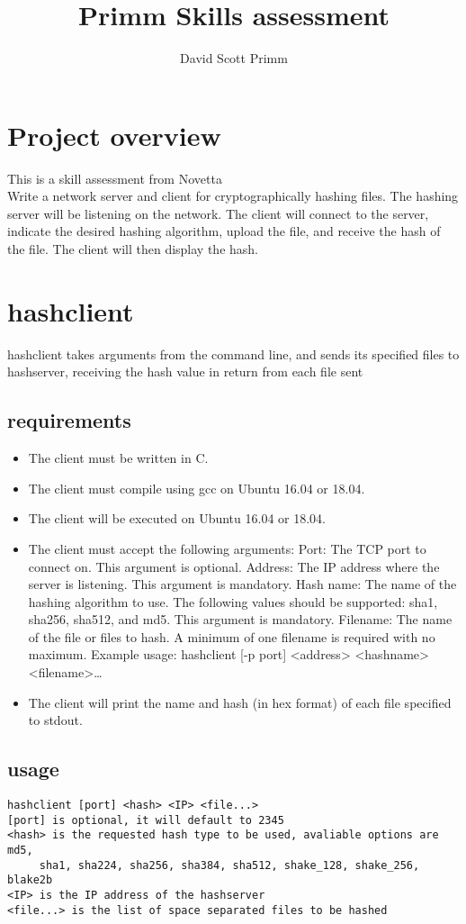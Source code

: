 \documentclass[12pt]{article}
\begin{document}
\title{Primm Skills assessment}
\author{David Scott Primm}
\maketitle
\pagebreak

\tableofcontents
\pagebreak 
\section{Project overview}
This is a skill assessment from Novetta\\
Write a network server and client for cryptographically hashing files. The hashing server will be listening on the network. The client will connect to the server, indicate the desired hashing algorithm, upload the file, and receive the hash of the file. The client will then display the hash.
\section{hashclient}
hashclient takes arguments from the command line, and sends its specified files to hashserver, receiving the hash value in return from each file sent
\subsection{requirements}
\begin{itemize}
	\item The client must be written in C.
	\item The client must compile using gcc on Ubuntu 16.04 or 18.04.
	\item The client will be executed on Ubuntu 16.04 or 18.04.
	\item The client must accept the following arguments:
	\subitem Port: The TCP port to connect on. This argument is optional.
	\subitem Address: The IP address where the server is listening. This argument is mandatory.
	\subitem Hash name: The name of the hashing algorithm to use. The following values should be supported: sha1, sha256, sha512, and md5. This argument is mandatory.
	\subitem Filename: The name of the file or files to hash. A minimum of one filename is required with no maximum.
	\subitem Example usage: hashclient [-p port] <address> <hashname> <filename>…
	\item The client will print the name and hash (in hex format) of each file specified to stdout.
\end{itemize}
\subsection{usage}
\begin{verbatim}
hashclient [port] <hash> <IP> <file...>
[port] is optional, it will default to 2345 
<hash> is the requested hash type to be used, avaliable options are md5,
     sha1, sha224, sha256, sha384, sha512, shake_128, shake_256, blake2b
<IP> is the IP address of the hashserver
<file...> is the list of space separated files to be hashed
\end{verbatim}
\end{document}
